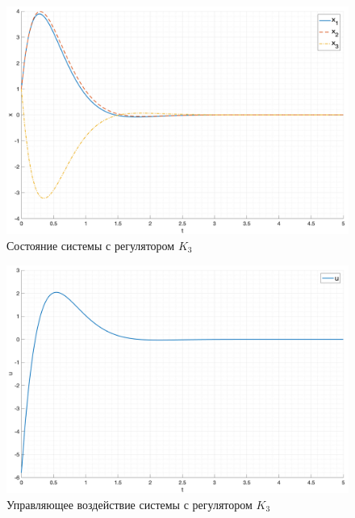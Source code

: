 \begin{figure}[ht!]
    \centering
    \includegraphics[width=\textwidth]{media/plots/task3_3_x.png}
    \caption{Состояние системы с регулятором $K_3$}
    \label{fig:task3_3_x}
\end{figure}
\begin{figure}[ht!]
    \centering
    \includegraphics[width=\textwidth]{media/plots/task3_3_u.png}
    \caption{Управляющее воздействие системы с регулятором $K_3$}
    \label{fig:task3_3_u}
\end{figure}


